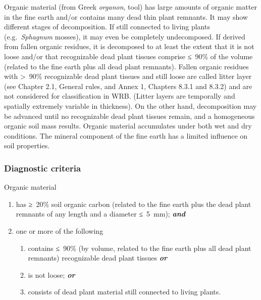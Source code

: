\documentclass[
  letterpaper,
  DIV=11,
  numbers=noendperiod]{scrreprt}
\providecommand{\tightlist}{%
  \setlength{\itemsep}{0pt}\setlength{\parskip}{0pt}}\usepackage{longtable,booktabs,array}
\begin{document}
Organic material (from Greek \emph{organon}, tool) has large amounts of
organic matter in the fine earth and/or contains many dead thin plant
remnants. It may show different stages of decomposition. If still
connected to living plants (e.g.~\emph{Sphagnum} mosses), it may even be
completely undecomposed. If derived from fallen organic residues, it is
decomposed to at least the extent that it is not loose and/or that
recognizable dead plant tissues comprise ≤~90\% of the volume (related
to the fine earth plus all dead plant remnants). Fallen organic residues
with \textgreater~90\% recognizable dead plant tissues and still loose
are called litter layer (see Chapter 2.1, General rules, and Annex 1,
Chapters 8.3.1 and 8.3.2) and are not considered for classification in
WRB. (Litter layers are temporally and spatially extremely variable in
thickness). On the other hand, decomposition may be advanced until no
recognizable dead plant tissues remain, and a homogeneous organic soil
mass results. Organic material accumulates under both wet and dry
conditions. The mineral component of the fine earth has a limited
influence on soil properties.

\hypertarget{diagnostic-criteria-69}{%
\subsubsection{Diagnostic criteria}\label{diagnostic-criteria-69}}

Organic material

\begin{enumerate}
\def\labelenumi{\arabic{enumi}.}
\tightlist
\item
  has ≥~20\% soil organic carbon (related to the fine earth plus the
  dead plant remnants of any length and a diameter ≤~5~mm);
  \textbf{\emph{and}}
\item
  one or more of the following

  \begin{enumerate}
  \def\labelenumii{\alph{enumii}.}
  \tightlist
  \item
    contains ≤~90\% (by volume, related to the fine earth plus all dead
    plant remnants) recognizable dead plant tissues \textbf{\emph{or}}
  \item
    is not loose; \textbf{\emph{or}}
  \item
    consists of dead plant material still connected to living plants.
  \end{enumerate}
\end{enumerate}
\end{document}
